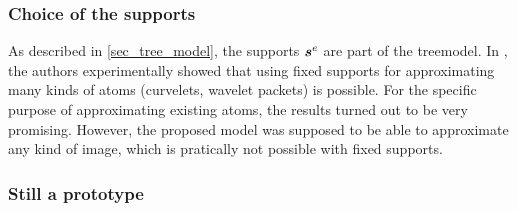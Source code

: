 \subsubsection{Choice of the supports}

As described in \cref{sec_tree_model}, the supports $\bm{s}^e$ are part of the \gls{treemodel}. In \cite{chabiron_toward_2015}, the authors experimentally showed that using fixed supports for approximating many kinds of atoms (curvelets, wavelet packets) is possible. For the specific purpose of approximating existing atoms, the results turned out to be very promising. However, the proposed model was supposed to be able to approximate any kind of image, which is pratically not possible with fixed supports.

\subsubsection{Still a prototype}

